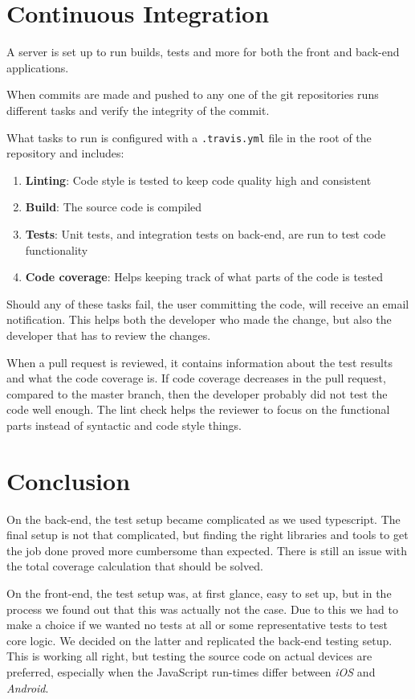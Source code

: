 \section{Continuous Integration}
A  server is set up to run builds, tests and more for both the front and back-end applications.

When commits are made and pushed to any one of the git repositories  runs different tasks and verify the integrity of the commit.

What tasks to run is configured with a \verb+.travis.yml+ file in the root of the repository and includes:

\begin{enumerate}
\item \textbf{Linting}: Code style is tested to keep code quality high and consistent
\item \textbf{Build}: The source code is compiled
\item \textbf{Tests}: Unit tests, and integration tests on back-end, are run to test code functionality
\item \textbf{Code coverage}: Helps keeping track of what parts of the code is tested
\end{enumerate}

Should any of these tasks fail, the user committing the code, will receive an email notification.
This helps both the developer who made the change, but also the developer that has to review the changes.

When a pull request is reviewed, it contains information about the test results and what the code coverage is.
If code coverage decreases in the pull request, compared to the master branch, then the developer probably did not test the code well enough.
The lint check helps the reviewer to focus on the functional parts instead of syntactic and code style things.



\section{Conclusion}
On the back-end, the test setup became complicated as we used \gls{typescript}.
The final setup is not that complicated, but finding the right libraries and tools to get the job done proved more cumbersome than expected.
There is still an issue with the total coverage calculation that should be solved.

On the front-end, the test setup was, at first glance, easy to set up, but in the process we found out that this was actually not the case.
Due to this we had to make a choice if we wanted no tests at all or some representative tests to test core logic.
We decided on the latter and replicated the back-end testing setup.
This is working all right, but testing the source code on actual devices are preferred, especially when the JavaScript run-times differ between \textit{iOS} and \textit{Android}.

